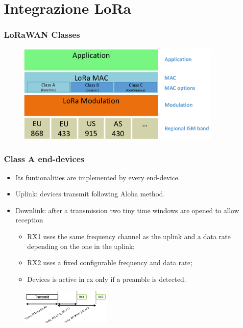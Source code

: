 \section{Integrazione LoRa}

\begin{frame}[fragile]
  \frametitle{LoRaWAN Classes}
  \begin{figure}
    \centering
    \includegraphics[width=0.9\textwidth]{img/loraClasses.png}
  \end{figure}
\end{frame}


\begin{frame}[fragile]
  \frametitle{Class A end-devices}
  \begin{itemize}
    \item Its funtionalities are implemented by every end-device.
    \item Uplink: devices transmit following Aloha method.
    \item Downlink: after a transmission two tiny time windows are opened to allow reception
    \begin{itemize}
      \item RX1 uses the same frequency channel as the uplink and a data rate depending on the one in the uplink;
      \item RX2 uses a fixed configurable frequency and data rate;
      \item Devices is active in rx only if a preamble is detected.
    \end{itemize}
  \end{itemize}
  \begin{figure}
		\centering
		\includegraphics[width=0.4\textwidth]{img/lora_rx_windows.png}
  \end{figure}
\end{frame}

